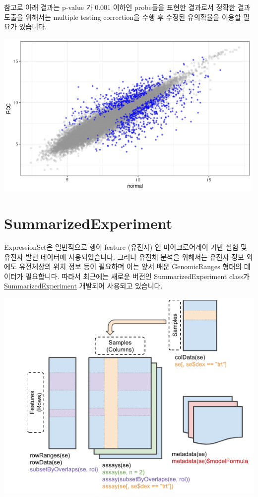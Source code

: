 \documentclass[
]{book}
\begin{document}
참고로 아래 결과는 p-value 가 0.001 이하인 probe들을 표현한 결과로서 정확한 결과 도출을 위해서는 multiple testing correction을 수행 후 수정된 유의확율을 이용할 필요가 있습니다.

\includegraphics[width=5.20833in,height=\textheight]{images/12/000024.png}

\hypertarget{summarizedexperiment}{%
\section{SummarizedExperiment}\label{summarizedexperiment}}

ExpressionSet은 일반적으로 행이 feature (유전자) 인 마이크로어레이 기반 실험 및 유전자 발현 데이터에 사용되었습니다. 그러나 유전체 분석을 위해서는 유전자 정보 외에도 유전체상의 위치 정보 등이 필요하며 이는 앞서 배운 GenomicRanges 형태의 데이터가 필요합니다. 따라서 최근에는 새로운 버전인 SummarizedExperiment class가 \href{https://bioconductor.org/packages/release/bioc/html/SummarizedExperiment.html}{SummarizedExperiment} 개발되어 사용되고 있습니다.

\includegraphics{images/summarizedexp.PNG}
\end{document}
